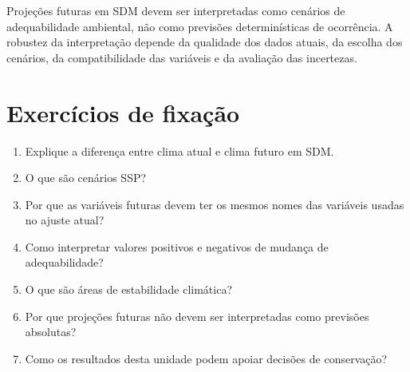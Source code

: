 \begin{conceito}[title={\faBook\quad Mensagem central}]
	Projeções futuras em SDM devem ser interpretadas como cenários de adequabilidade ambiental, não como previsões determinísticas de ocorrência. A robustez da interpretação depende da qualidade dos dados atuais, da escolha dos cenários, da compatibilidade das variáveis e da avaliação das incertezas.
\end{conceito}

\section{Exercícios de fixação}

\begin{enumerate}
	\item Explique a diferença entre clima atual e clima futuro em SDM.
	\item O que são cenários SSP?
	\item Por que as variáveis futuras devem ter os mesmos nomes das variáveis usadas no ajuste atual?
	\item Como interpretar valores positivos e negativos de mudança de adequabilidade?
	\item O que são áreas de estabilidade climática?
	\item Por que projeções futuras não devem ser interpretadas como previsões absolutas?
	\item Como os resultados desta unidade podem apoiar decisões de conservação?
\end{enumerate}


